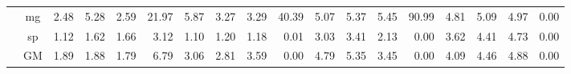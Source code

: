 \begin{table*}[]
\begin{center}
{\begin{tabular}{|c|c|rrrr|rrrr|rrrr|rrrr|}
 &  mg  &  2.48  &  5.28  & \cellcolor{blue!25} 2.59  &  21.97  &  5.87  & \cellcolor{blue!25} 3.27  &  3.29  &  40.39  &  5.07  &  5.37  &  5.45  &  90.99  &  4.81  &  5.09  & \cellcolor{blue!25} 4.97  &  0.00 \\
 &  sp  &  1.12  &  1.62  &  1.66  &   3.12  &  1.10  &  1.20  & \cellcolor{blue!25} 1.18  &   0.01  &  3.03  &  3.41  & \cellcolor{blue!25} 2.13  &   0.00  &  3.62  &  4.41  &  4.73  &  0.00 \\ \cline{2-18}
 &  GM  &  1.89  & \cellcolor{blue!25} 1.88  & \cellcolor{blue!25} 1.79  &   6.79  &  3.06  & \cellcolor{blue!25} 2.81  &  3.59  &   0.00  &  4.79  &  5.35  & \cellcolor{blue!25} 3.45  &   0.00  &  4.09  &  4.46  &  4.88  &  0.00 \\
\hline 
\end{tabular} }

\end{center}
\end{table*}
